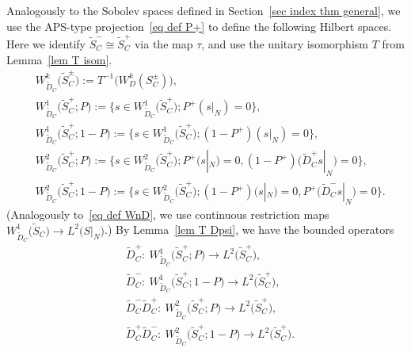 \documentclass[pdftex]{sigma}%
\numberwithin{equation}{section}
\begin{document}
Analogously to the Sobolev spaces defined in Section~\ref{sec index thm general}, we use the APS-type projection~\eqref{eq def P+} to define the following Hilbert spaces. Here we identify $\widetilde{S}_C^- \cong \widetilde{S}_C^+$ via the map $\tau$, and use the
unitary isomorphism $T$ from Lemma~\ref{lem T isom}.
\begin{align*}
&W^k_{\widetilde{D}_C}\big(\widetilde{S}_C^{\pm}\big) :=T^{-1}\big(W^k_D(S_C^{\pm})\big),
\\
&W^1_{\widetilde{D}_C}\big(\widetilde{S}_C^+; P\big) := \big\{s \in W^1_{\widetilde{D}_C}\big(\widetilde{S}_C^+\big); P^+(s|_N) = 0\big\},
\\
&W^1_{\widetilde{D}_C}\big(\widetilde{S}_C^+;1- P\big) := \big\{s \in W^1_{\widetilde{D}_C}\big(\widetilde{S}_C^+\big); (1-P^+)(s|_N) = 0\big\},
\\
&W^2_{\widetilde{D}_C}\big(\widetilde{S}_C^+; P\big) := \big\{s \in W^2_{\widetilde{D}_C}\big(\widetilde{S}_C^+\big); P^+(s|_N) = 0, (1-P^+)\big(\widetilde{D}_C^+s|_N\big) = 0\big\},
\\
&W^2_{\widetilde{D}_C}\big(\widetilde{S}_C^+; 1-P\big) := \big\{s \in W^2_{\widetilde{D}_C}\big(\widetilde{S}_C^+\big); (1-P^+)(s|_N) = 0, P^+\big(\widetilde{D}_C^-s|_N\big) = 0\big\}.
\end{align*}
\big(Analogously to~\eqref{eq def WnD}, we use continuous restriction maps $W^1_{\widetilde{D}_C}\big(\widetilde{S}_C\big) \to L^2\big(S|_N\big)$.\big)
By Lem\-ma~\ref{lem T Dpsi}, we have the bounded operators
\begin{align}
&\widetilde{D}_C^+\colon\ W^1_{\widetilde{D}_C}\big(\widetilde{S}_C^+; P\big) \to L^2\big(\widetilde{S}_C^+\big), \label{eq D0+ P}\\
&\widetilde{D}_C^-\colon\ W^1_{\widetilde{D}_C}\big(\widetilde{S}_C^+; 1-P\big) \to L^2\big(\widetilde{S}_C^+\big),\label{eq D0- 1-P} \\
&\widetilde{D}_C^- \widetilde{D}_C^+\colon\ W^2_{\widetilde{D}_C}\big(\widetilde{S}_C^+; P\big) \to L^2\big(\widetilde{S}_C^+\big), \label{eq D0-D0+ P}\\
&\widetilde{D}_C^+ \widetilde{D}_C^-\colon\ W^2_{\widetilde{D}_C}\big(\widetilde{S}_C^+; 1-P\big) \to L^2\big(\widetilde{S}_C^+\big).\label{eq D0+D0- 1-P}
\end{align}
\end{document}
